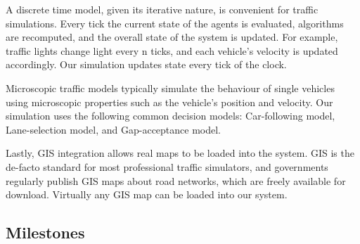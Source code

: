 \documentclass[11pt]{article}
\begin{document}
A discrete time model, given its iterative nature, is convenient for traffic simulations. Every tick the current state of the agents is evaluated, algorithms are recomputed, and the overall state of the system is updated. For example, traffic lights change light every n ticks, and each vehicle\textquoteright s velocity is updated accordingly. Our simulation updates state every tick of the clock.

Microscopic traffic models typically simulate the behaviour of single vehicles using microscopic properties such as the vehicle\textquoteright s position and velocity. Our simulation uses the following common decision models\cite{8h}: Car-following model, Lane-selection model, and Gap-acceptance model.

Lastly, GIS integration allows real maps to be loaded into the system. GIS is the de-facto standard for most professional traffic simulators, and governments regularly publish GIS maps about road networks, which are freely available for download. Virtually any GIS map can be loaded into our system.

\subsection{Milestones}
\end{document}
